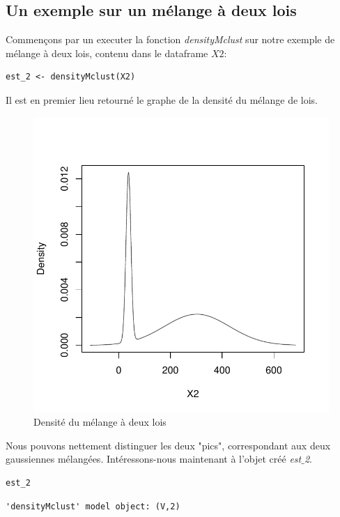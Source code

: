 \documentclass[frenchb]{report}
\newcommand{\1}{\mathbbm{1}}
\theoremstyle{definition}\newtheorem{defn}{Définition}
\theoremstyle{definition}\newtheorem{exm}{Exemple}
\theoremstyle{definition}\newtheorem{nota}{Notation}
\theoremstyle{definition}\newtheorem{rem}{Remarque}
\begin{document}
\begin{appendices}
\section{Un exemple sur un mélange à deux lois}
Commençons par un executer la fonction \textit{densityMclust} sur notre exemple de mélange à deux lois, contenu dans le dataframe $X2$:
\begin{lstlisting}
est_2 <- densityMclust(X2)
\end{lstlisting}
%
Il est en premier lieu retourné le graphe de la densité du mélange de lois.
\begin{figure}[H]
\centering
\includegraphics[scale=0.75]{fig1.pdf}
\caption{Densité du mélange à deux lois}
\end{figure}
Nous pouvons nettement distinguer les deux "pics", correspondant aux deux gaussiennes mélangées.
Intéressons-nous maintenant à l'objet créé \textit{est$\_$2}.
\begin{lstlisting}
est_2
\end{lstlisting}
\begin{verbatim}
'densityMclust' model object: (V,2) 


\end{verbatim}
\end{appendices}
\end{document}

